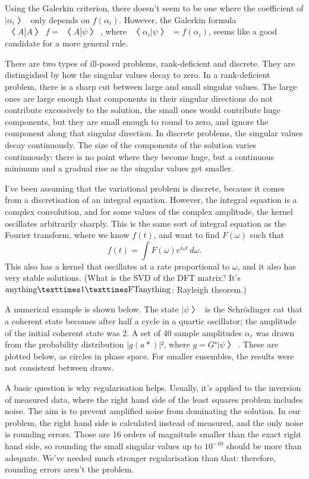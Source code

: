 Using the Galerkin criterion, there doesn't seem to be one where the coefficient of $|α_i〉$ only depends on $f(α_i)$.  However, the Galerkin formula $〈A|A〉f=〈A|ψ〉$, where $〈α_i|ψ〉=f(α_i)$, seems like a good candidate for a more general rule.

There are two types of ill-posed problems, rank-deficient and discrete.  They are distingished by how the singular values decay to zero.  In a rank-deficient problem, there is a sharp cut between large and small singular values.  The large ones are large enough that components in their singular directions do not contribute excessively to the solution, the small ones would contribute huge components, but they are small enough to round to zero, and ignore the component along that singular direction.  In discrete problems, the singular values decay continuously.  The size of the components of the solution varies continuously: there is no point where they become huge, but a continuous minimum and a gradual rise as the singular values get smaller.

I've been assuming that the variational problem is discrete, because it comes from a discretisation of an integral equation.  However, the integral equation is a complex convolution, and for some values of the complex amplitude, the kernel oscillates arbitrarily sharply.  This is the same sort of integral equation as the Fourier transform, where we know $f(t)$, and want to find $F(ω)$ such that
$$f(t)=\int F(ω)e^{iωt}\,dω.$$
This also has a kernel that oscillates at a rate proportional to $ω$, and it also has very stable solutions.  (What is the SVD of the DFT matrix?  It's ${\rm anything}×1×{\rm FT anything}$: Rayleigh theorem.)

A numerical example is shown below.  The state $|ψ〉$ is the Schrödinger cat that a coherent state becomes after half a cycle in a quartic oscillator; the amplitude of the initial coherent state was $2$.  A set of 40 sample amplitudes $α_r$ was drawn from the probability distribution $|g(a*)|²$, where $g=G⁺|ψ〉$.  These are plotted below, as circles in phase space.  For smaller ensembles, the results were not consistent between draws.

A basic question is why regularisation helps.  Usually, it's applied to the inversion of measured data, where the right hand side of the least squares problem includes noise.  The aim is to prevent amplified noise from dominating the solution.  In our problem, the right hand side is calculated instead of measured, and the only noise is rounding errors.  Those are 16 orders of magnitude smaller than the exact right hand side, so rounding the small singular values up to $10^{-10}$ should be more than adequate.  We've needed much stronger regularisation than that: therefore, rounding errors aren't the problem.

